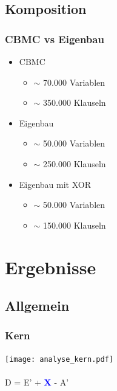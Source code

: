 \documentclass{beamer}
\begin{document}
  \subsection{Komposition}
  \begin{frame}
    \frametitle{CBMC vs Eigenbau}
    \begin{itemize}
      \item CBMC
      \begin{itemize}
        \item $ \sim $ 70.000 Variablen
        \item $ \sim $ 350.000 Klauseln
      \end{itemize}
      \item Eigenbau
      \begin{itemize}
        \item $ \sim $ 50.000 Variablen
        \item $ \sim $ 250.000 Klauseln
      \end{itemize}
      \item Eigenbau mit XOR
      \begin{itemize}
        \item $ \sim $ 50.000 Variablen
        \item $ \sim $ 150.000 Klauseln
      \end{itemize}
    \end{itemize}
  \end{frame}

\section{Ergebnisse}
  \subsection{Allgemein}
    \begin{frame}
      \frametitle{Kern}
      \texttt{[image: analyse\_kern.pdf]}\\
      ~\\
      D = E' + \textcolor{blue}{\textbf{X}} - A'\\
    \end{frame}
\end{document}
